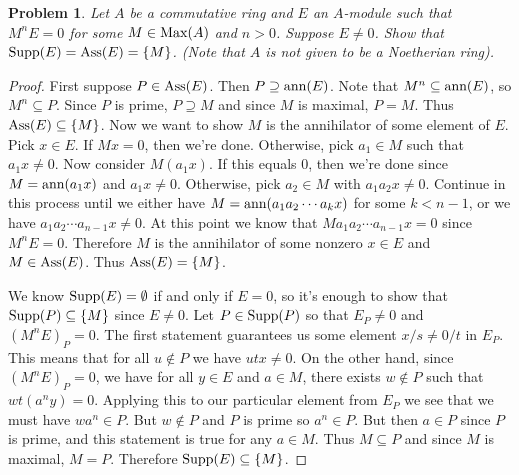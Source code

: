 \documentclass{article}
\newcommand{\ass}{\textup{Ass}}
\newcommand{\supp}{\textup{Supp}}
\newcommand{\ann}{\textup{ann}}
\newcommand{\Max}{\textup{Max}}
\newtheorem{problem}{Problem}
\begin{document}
\begin{problem}
Let $A$ be a commutative ring and $E$ an $A$-module such that $M^nE = 0$ for some $M \in \Max(A)$ and $n > 0$. Suppose $E \neq 0$. Show that $\supp(E) = \ass(E) = \{M\}$. (Note that $A$ is not given to be a Noetherian ring).
\end{problem}
\begin{proof}
First suppose $P \in \ass(E)$. Then $P \supseteq \ann(E)$. Note that $M^n \subseteq \ann(E)$, so $M^n \subseteq P$. Since $P$ is prime, $P \supseteq M$ and since $M$ is maximal, $P = M$. Thus $\ass(E) \subseteq \{M\}$. Now we want to show $M$ is the annihilator of some element of $E$. Pick $x \in E$. If $Mx = 0$, then we're done. Otherwise, pick $a_1 \in M$ such that $a_1x \neq 0$. Now consider $M(a_1x)$. If this equals $0$, then we're done since $M = \ann(a_1x)$ and $a_1x \neq 0$. Otherwise, pick $a_2 \in M$ with $a_1a_2x \neq 0$. Continue in this process until we either have $M = \ann(a_1a_2 \cdots a_kx)$ for some $k < n-1$, or we have $a_1a_2 \cdots a_{n-1}x \neq 0$. At this point we know that $Ma_1a_2 \cdots a_{n-1}x = 0$ since $M^nE = 0$. Therefore $M$ is the annihilator of some nonzero $x \in E$ and $M \in \ass(E)$. Thus $\ass(E) = \{M\}$.

We know $\supp(E) = \emptyset$ if and only if $E = 0$, so it's enough to show that $\supp(P) \subseteq \{M\}$ since $E \neq 0$. Let $P \in \supp(P)$ so that $E_P \neq 0$ and $(M^nE)_P = 0$. The first statement guarantees us some element $x/s \neq 0/t$ in $E_P$. This means that for all $u \notin P$ we have $utx \neq 0$. On the other hand, since $(M^nE)_P = 0$, we have for all $y \in E$ and $a \in M$, there exists $w \notin P$ such that $wt(a^ny) = 0$. Applying this to our particular element from $E_P$ we see that we must have $wa^n \in P$. But $w \notin P$ and $P$ is prime so $a^n \in P$. But then $a \in P$ since $P$ is prime, and this statement is true for any $a \in M$. Thus $M \subseteq P$ and since $M$ is maximal, $M = P$. Therefore $\supp(E) \subseteq \{M\}$.
\end{proof}
\end{document}
